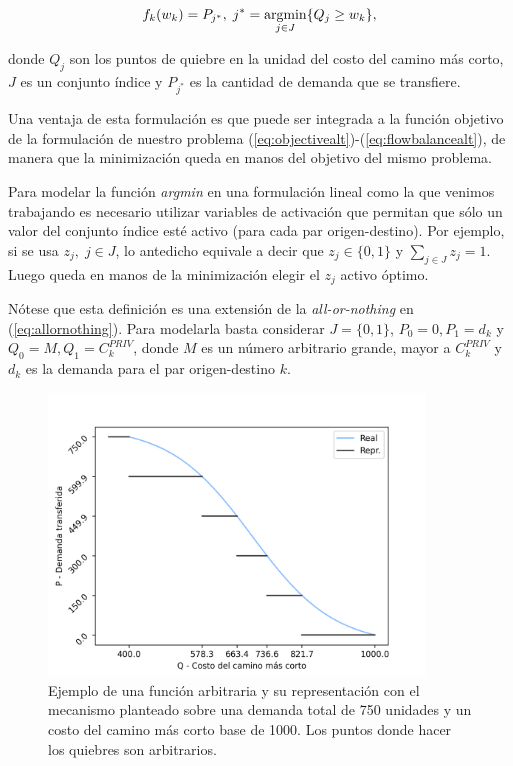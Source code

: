 \begin{equation}
  \label{eq:deffks}
  f_k(w_k) = P_{j^*},\; j^* = \mathop{\mathrm{argmin}}_{j \in J} \{Q_j \geq w_k\},
\end{equation}

donde $Q_j$ son los puntos de quiebre en la unidad del costo del camino más corto, $J$ es un conjunto índice y $P_{j^*}$ es la cantidad de demanda que se transfiere.

Una ventaja de esta formulación es que puede ser integrada a la función objetivo de la formulación de nuestro problema (\ref{eq:objectivealt})-(\ref{eq:flowbalancealt}), de manera que la minimización queda en manos del objetivo del mismo problema.

Para modelar la función {\it argmin} en una formulación lineal como la que venimos trabajando es necesario utilizar variables de activación que permitan que sólo un valor del conjunto índice esté activo (para cada par origen-destino). Por ejemplo, si se usa $z_j,\; j \in J$, lo antedicho equivale a decir que $z_j \in \{0,1\}$ y $\sum_{j \in J} z_j = 1$. Luego queda en manos de la minimización elegir el $z_j$ activo óptimo.

Nótese que esta definición es una extensión de la {\it all-or-nothing} en (\ref{eq:allornothing}). Para modelarla basta considerar $J = \{0, 1\}$, $P_0 = 0, P_1 = d_k$ y $Q_0 = M, Q_1 = C^{PRIV}_k$, donde $M$ es un número arbitrario grande, mayor a $C^{PRIV}_k$ y $d_k$ es la demanda para el par origen-destino $k$.

\begin{figure}[h!]
  \centering
  \includegraphics[width=10cm]{../resources/f_example.png}
  \caption{Ejemplo de una función arbitraria y su representación con el mecanismo planteado sobre una demanda total de 750 unidades y un costo del camino más corto base de 1000. Los puntos donde hacer los quiebres son arbitrarios.}
  \label{fig:fdrawexample}
\end{figure}

